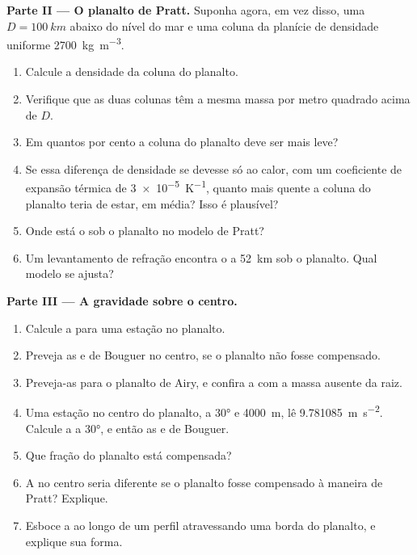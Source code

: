 \begin{problem}
\noindent\textbf{Parte II --- O planalto de Pratt.}
Suponha agora, em vez disso, uma  $D = \qty{100}{km}$ abaixo do nível do mar e
uma coluna da planície de densidade uniforme \qty{2700}{kg.m^{-3}}.
\begin{enumerate}[resume]
  \item Calcule a densidade da coluna do planalto.
  \item Verifique que as duas colunas têm a mesma massa por metro quadrado acima de
        $D$.
  \item Em quantos por cento a coluna do planalto deve ser mais leve?
  \item Se essa diferença de densidade se devesse só ao calor, com um coeficiente de
        expansão térmica de \qty{3e-5}{K^{-1}}, quanto mais quente a coluna do planalto teria de estar, em média? Isso é plausível?
  \item Onde está o  sob o planalto no modelo de Pratt?
  \item Um levantamento de refração encontra o  a \qty{52}{km} sob o planalto.
        Qual modelo se ajusta?
\end{enumerate}

\noindent\textbf{Parte III --- A gravidade sobre o centro.}
\begin{enumerate}[resume]
  \item Calcule a  para uma estação no planalto.
  \item Preveja as  e de Bouguer no centro, se o planalto
        não fosse compensado.
  \item Preveja-as para o planalto de Airy, e confira a  com a
        massa ausente da raiz.
  \item Uma estação no centro do planalto, a  \ang{30} e
        \qty{4000}{m}, lê \qty{9.781085}{m.s^{-2}}. Calcule a 
        a \ang{30}, e então as  e de Bouguer.
  \item Que fração do planalto está compensada?
  \item A  no centro seria diferente se o planalto fosse compensado
        à maneira de Pratt? Explique.
  \item Esboce a  ao longo de um perfil atravessando uma borda do
        planalto, e explique sua forma.
\end{enumerate}


\end{problem}
